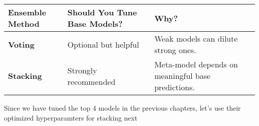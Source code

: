 \documentclass[
  letterpaper,
  DIV=11,
  numbers=noendperiod]{scrreprt}
\begin{document}
\begin{longtable}[]{@{}
  >{\raggedright\arraybackslash}p{}
  >{\raggedright\arraybackslash}p{}
  >{\raggedright\arraybackslash}p{}@{}}
\toprule\noalign{}
\begin{minipage}[b]{\linewidth}\raggedright
Ensemble Method
\end{minipage} & \begin{minipage}[b]{\linewidth}\raggedright
Should You Tune Base Models?
\end{minipage} & \begin{minipage}[b]{\linewidth}\raggedright
Why?
\end{minipage} \\
\midrule\noalign{}
\endhead
\bottomrule\noalign{}
\endlastfoot
\textbf{Voting} & Optional but helpful & Weak models can dilute strong
ones. \\
\textbf{Stacking} & Strongly recommended & Meta-model depends on
meaningful base predictions. \\
\end{longtable}

Since we have tuned the top 4 models in the previous chapters, let's use
their optimized hyperparamters for stacking next
\end{document}
